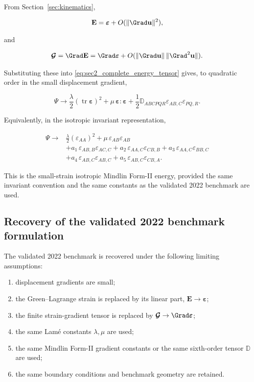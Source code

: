 \documentclass[11pt]{article}
\DeclareMathOperator{\tr}{tr}
\begin{document}
From Section~\ref{sec:kinematics},

\begin{equation}
\mathbf{E}
=
\bm{\varepsilon}
+
O(\|\Grad\mathbf{u}\|^2),
\label{eq:sec2_E_small_recovery}
\end{equation}

and

\begin{equation}
\bm{\mathcal{G}}
=
\Grad\mathbf{E}
=
\Grad\bm{\varepsilon}
+
O(\|\Grad\mathbf{u}\|\,\|\Grad^2\mathbf{u}\|).
\label{eq:sec2_G_small_recovery}
\end{equation}

Substituting these into \eqref{eq:sec2_complete_energy_tensor} gives, to quadratic order in the small displacement gradient,

\begin{equation}
\Psi
\rightarrow
\frac{\lambda}{2}(\tr\bm{\varepsilon})^2
+
\mu\,\bm{\varepsilon}:\bm{\varepsilon}
+
\frac{1}{2}\mathbb{D}_{ABCPQR}
\varepsilon_{AB,C}\varepsilon_{PQ,R}.
\label{eq:sec2_small_strain_energy_tensor}
\end{equation}

Equivalently, in the isotropic invariant representation,

\begin{align}
\Psi
\rightarrow
&
\frac{\lambda}{2}(\varepsilon_{AA})^2
+
\mu\,\varepsilon_{AB}\varepsilon_{AB}
\nonumber\\
&
+ a_1\,\varepsilon_{AB,B}\varepsilon_{AC,C}
+ a_2\,\varepsilon_{AA,C}\varepsilon_{CB,B}
+ a_3\,\varepsilon_{AA,C}\varepsilon_{BB,C}
\nonumber\\
&
+ a_4\,\varepsilon_{AB,C}\varepsilon_{AB,C}
+ a_5\,\varepsilon_{AB,C}\varepsilon_{CB,A}.
\label{eq:sec2_small_strain_energy_invariants}
\end{align}

This is the small-strain isotropic Mindlin Form-II energy, provided the same invariant convention and the same constants as the validated 2022 benchmark are used.

\subsection{Recovery of the validated 2022 benchmark formulation}

The validated 2022 benchmark is recovered under the following limiting assumptions:

\begin{enumerate}
\item displacement gradients are small;
\item the Green--Lagrange strain is replaced by its linear part, $\mathbf{E}\rightarrow\bm{\varepsilon}$;
\item the finite strain-gradient tensor is replaced by $\bm{\mathcal{G}}\rightarrow\Grad\bm{\varepsilon}$;
\item the same Lam\'{e} constants $\lambda,\mu$ are used;
\item the same Mindlin Form-II gradient constants or the same sixth-order tensor $\mathbb{D}$ are used;
\item the same boundary conditions and benchmark geometry are retained.
\end{enumerate}
\end{document}
